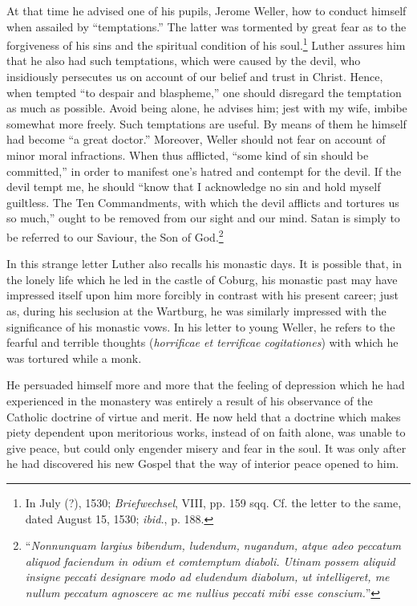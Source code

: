 At that time he advised one of his pupils, Jerome Weller, how to conduct
himself when assailed by “temptations.” The latter was tormented by great
fear as to the forgiveness of his sins and the spiritual condition of his soul.\footnote
{In July (?), 1530; \textit{Briefwechsel}, VIII, pp. 159 sqq. Cf. the letter to the same, dated
August 15, 1530; \textit{ibid.}, p. 188.}
Luther assures him that he also had such temptations, which were caused by
the devil, who insidiously persecutes us on account of our belief and trust in
Christ. Hence, when tempted “to despair and blaspheme,” one should disregard
the temptation as much as possible. Avoid being alone, he advises him;
jest with my wife, imbibe somewhat more freely. Such temptations are useful.
By means of them he himself had become “a great doctor.” Moreover,
Weller should not fear on account of minor moral infractions. When thus
afflicted, “some kind of sin should be committed,” in order to manifest one’s
hatred and contempt for the devil. If the devil tempt me, he should “know
that I acknowledge no sin and hold myself guiltless. The Ten Commandments,
with which the devil afflicts and tortures us so much,” ought to be
removed from our sight and our mind. Satan is simply to be referred to our
Saviour, the Son of God.\footnote
{“\textit{Nonnunquam largius bibendum, ludendum, nugandum, atque adeo peccatum aliquod
faciendum in odium et comtemptum diaboli. Utinam possem aliquid insigne peccati designare
modo ad eludendum diabolum, ut intelligeret, me nullum peccatum agnoscere ac me
nullius peccati mibi esse conscium.}”}

In this strange letter Luther also recalls his monastic days. It is possible
that, in the lonely life which he led in the castle of Coburg, his monastic
past may have impressed itself upon him more forcibly in contrast with his
present career; just as, during his seclusion at the Wartburg, he was similarly
impressed with the significance of his monastic vows. In his letter to young
Weller, he refers to the fearful and terrible thoughts (\textit{horrificae et terrificae
cogitationes}) with which he was tortured while a monk.

He persuaded himself more and more that the feeling of depression
which he had experienced in the monastery was entirely a result of
his observance of the Catholic doctrine of virtue and merit. He now
held that a doctrine which makes piety dependent upon meritorious
works, instead of on faith alone, was unable to give peace, but could
only engender misery and fear in the soul. It was only after he had
discovered his new Gospel that the way of interior peace opened to
him.

